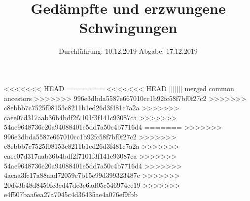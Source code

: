 

\subject{Versuch 354}
\title{Gedämpfte und erzwungene Schwingungen}
<<<<<<< HEAD
=======
<<<<<<< HEAD
||||||| merged common ancestors
>>>>>>> 996e3dbda5587e667010cc1b92fc58f7bf0f27c2
>>>>>>> c8ebbb7c7525f08153c8211b1ed26d3f481c7a2a
>>>>>>> caee07d317aab36b4bdf2f7101f3f141c93087ca
>>>>>>> 54ae9648736e20a94088401e5dd7a50c4b7716d4
=======
>>>>>>> 996e3dbda5587e667010cc1b92fc58f7bf0f27c2
>>>>>>> c8ebbb7c7525f08153c8211b1ed26d3f481c7a2a
>>>>>>> caee07d317aab36b4bdf2f7101f3f141c93087ca
>>>>>>> 54ae9648736e20a94088401e5dd7a50c4b7716d4
>>>>>>> 4acaa3fc17a88aad72059c7b15e99d399323487c
>>>>>>> 20d43b48d8450fc3ed47de3e6ad05c546974ce19
>>>>>>> e4f507baa6ea27a7045c4d36435ae4a076ef9fbb
\date{%
  Durchführung: 10.12.2019
  \hspace{3em}
  Abgabe: 17.12.2019
}



\maketitle
\thispagestyle{empty}
\tableofcontents
\newpage






\nocite{*}
\printbibliography{}


